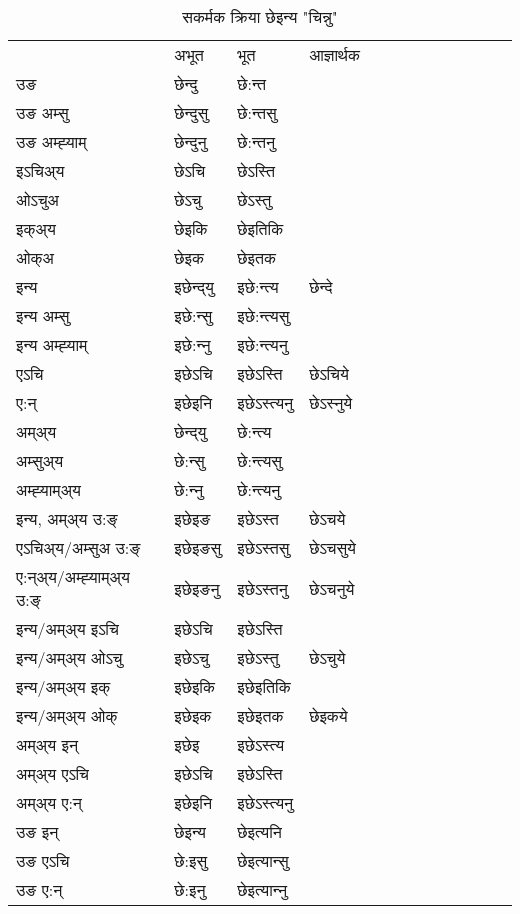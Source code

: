 \begin{table}[H]
\centering
\caption{\label{ent.vt} सकर्मक क्रिया  छेइन्य  "चिन्नु"  }
\begin{tabular}{l|l|l|l|l|l|l|l|l|l|l|l|l}  \toprule
&अभूत & भूत & आज्ञार्थक \\ 
उङ &छेन्दु &छे:न्त \\ 
उङ अम्सु&छेन्दुसु &छे:न्तसु \\ 
उङ अम्ह्‍याम्&छेन्दुनु &छे:न्तनु \\ 
इऽचिअ्य &छेऽचि &छेऽस्ति   \\ 
ओऽचुअ        &छेऽचु &छेऽस्तु   \\ 
इक्अ्य&छेइकि &छेइतिकि   \\ 
ओक्अ &छेइक &छेइतक   \\ 
इन्य & इछेन्द्‌यु  & इछे:न्त्य &छेन्दे  \\ 
इन्य अम्सु& इछे:न्सु  & इछे:न्त्यसु   \\ 
इन्य अम्ह्‍याम्& इछे:न्‍नु  & इछे:न्त्यनु   \\ 
एऽचि & इछेऽचि & इछेऽस्ति &छेऽचिये    \\ 
ए:न् & इछेइनि  & इछेऽस्त्यनु &छेऽस्‍नुये  \\ 
अम्अ्य & छेन्द्‌यु  & छे:न्त्य  \\ 
अम्सुअ्य & छे:न्सु & छे:न्त्यसु  \\ 
अम्ह्‍याम्अ्य & छे:न्‍नु  & छे:न्त्यनु \\ 
\midrule
इन्य, अम्अ्य उ:ङ्‌ &इछेइङ &इछेऽस्त &छेऽचये \\ 
एऽचिअ्य/अम्सुअ उ:ङ्‌ &इछेइङसु &इछेऽस्तसु &छेऽचसुये \\ 
ए:न्अ्य/अम्ह्‍याम्अ्य उ:ङ्‌ &इछेइङनु &इछेऽस्तनु &छेऽचनुये \\ 
इन्य/अम्अ्य इऽचि &इछेऽचि &इछेऽस्ति    \\ 
इन्य/अम्अ्य ओऽचु &इछेऽचु &इछेऽस्तु  &छेऽचुये  \\ 
इन्य/अम्अ्य इक् &इछेइकि &इछेइतिकि   \\ 
इन्य/अम्अ्य ओक् &इछेइक &इछेइतक  &छेइकये  \\ 
अम्अ्य इन् & इछेइ & इछेऽस्त्य   \\ 
अम्अ्य एऽचि & इछेऽचि & इछेऽस्ति    \\ 
अम्अ्य ए:न् & इछेइनि  & इछेऽस्त्यनु  \\ 
\midrule
उङ इन् & छेइन्य  & छेइत्यनि  \\ 
उङ एऽचि & छे:इसु  & छेइत्यान्सु   \\ 
उङ ए:न्& छे:इनु  & छेइत्यान्‍नु   \\ 
\bottomrule
\end{tabular}
\end{table}


